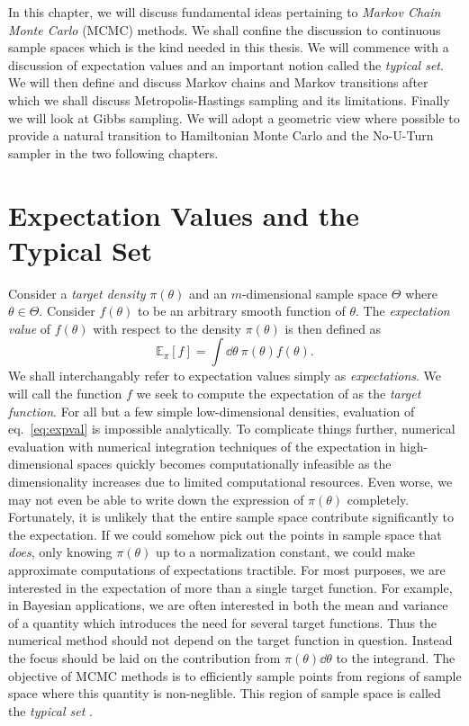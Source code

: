 In this chapter, we will discuss fundamental ideas pertaining to \textit{Markov Chain Monte Carlo} (MCMC) methods.
We shall confine the discussion to continuous sample spaces which is the kind needed in this thesis.
We will commence with a discussion of expectation values and an important notion called the \textit{typical set}. 
We will then define and discuss Markov chains and Markov transitions after which we shall
discuss Metropolis-Hastings sampling and its limitations. Finally we will
look at Gibbs sampling.
We will adopt a geometric view where possible to provide a natural transition to Hamiltonian Monte Carlo and the No-U-Turn sampler
in the two following chapters. 

\section{Expectation Values and the Typical Set}
Consider a \textit{target density} $\pi(\theta)$ and an $m$-dimensional sample space $\Theta$ where $\theta \in \Theta$. 
Consider $f(\theta)$ to be an arbitrary smooth
function of $\theta$. The \textit{expectation value} of $f(\theta)$ with respect to the density $\pi(\theta)$ is then defined as
\begin{equation}\label{eq:expval}
    \mathbb{E}_\pi[f] = \int \dd \theta \ \pi(\theta)f(\theta).
\end{equation}
We shall interchangably refer to expectation values simply as \textit{expectations}.
We will call the function $f$ we seek to compute the expectation of as the \textit{target function}.
For all but a few simple low-dimensional densities, evaluation of eq.~\eqref{eq:expval} is impossible analytically. 
To complicate things further, numerical evaluation with numerical integration techniques of the expectation in high-dimensional spaces quickly becomes computationally
infeasible as the dimensionality increases due to limited computational resources. 
Even worse, we may not even be able to write down the expression of $\pi(\theta)$ completely.
Fortunately, it is unlikely that the entire sample space contribute significantly to the expectation.
If we could somehow pick out the points in sample space that \textit{does}, only knowing $\pi(\theta)$ up to a normalization constant, we could
make approximate computations of expectations tractible. 
For most purposes, we are interested in the expectation of more than a single target function. For example, in Bayesian applications,
we are often interested in both the mean and variance of a quantity which introduces the need for several target functions. 
Thus the numerical method should not depend on the target function in question. 
Instead the focus should be laid on the contribution from $\pi(\theta)\dd \theta$ to
the integrand. The objective of MCMC methods is to efficiently 
sample points from regions of sample space where this quantity is non-neglible. This region of sample space
is called the \textit{typical set} \cite{conceptual_intro_hmc}. 

